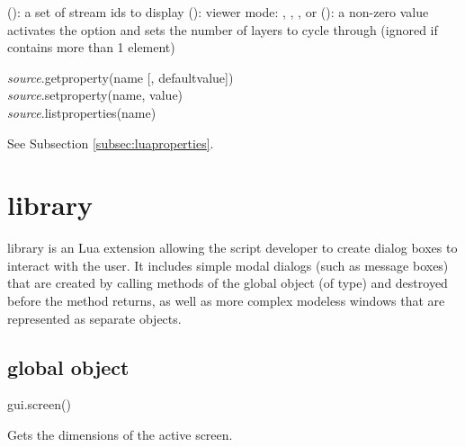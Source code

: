\documentclass[a4paper,12pt,twoside,extrafontsizes]{memoir}
\begin{document}
\begin{funcparams}
	 (): a set of stream ids to display
	 (): viewer mode: , , ,  or 
	 (): a non-zero value activates the  option and sets the number of layers to cycle through (ignored if  contains more than 1 element)
\end{funcparams}


\begin{luafuncprototype}
\emph{source}.getproperty(name [, defaultvalue])\\
\emph{source}.setproperty(name, value)\\
\emph{source}.listproperties(name)
\end{luafuncprototype}

\begin{funcdescr}
	See Subsection \ref{subsec:luaproperties}.
\end{funcdescr}

\section[gui library]{ library}

 library is an  Lua extension allowing the script developer to create dialog boxes to interact with the user. It includes simple modal dialogs (such as message boxes) that are created by calling methods of the  global object (of  type) and destroyed before the method returns, as well as more complex modeless windows that are represented as separate objects.

\subsection{ global object}
\label{subsec:luadialogserver}


\begin{luafuncprototype}
gui.screen()
\end{luafuncprototype}

\begin{funcdescr}
	Gets the dimensions of the active screen.
\end{funcdescr}
\end{document}
